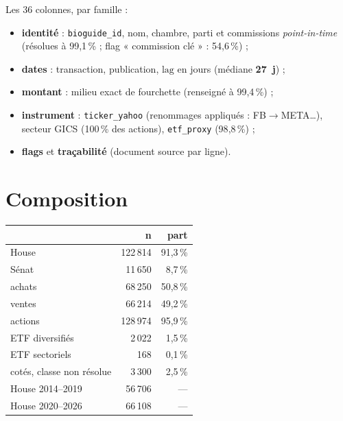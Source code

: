 \documentclass[10pt,a4paper,twocolumn]{article}
\newcommand{\code}[1]{\texttt{\small #1}}
\begin{document}
Les 36 colonnes, par famille :
\begin{itemize}
  \item \textbf{identité} : \code{bioguide\_id}, nom, chambre, parti et commissions
        \emph{point-in-time} (résolues à 99{,}1\,\% ; flag « commission clé » : 54{,}6\,\%) ;
  \item \textbf{dates} : transaction, publication, $\text{lag}$ en jours (médiane \textbf{27~j}) ;
  \item \textbf{montant} : milieu exact de fourchette (renseigné à 99{,}4\,\%) ;
  \item \textbf{instrument} : \code{ticker\_yahoo} (renommages appliqués : FB$\to$META\ldots),
        secteur GICS (100\,\% des actions), \code{etf\_proxy} (98{,}8\,\%) ;
  \item \textbf{flags} et \textbf{traçabilité} (document source par ligne).
\end{itemize}

\section{Composition}

\begin{center}
\begin{minipage}{\linewidth}\centering\small\setlength{\tabcolsep}{4pt}
\begin{tabular}{lrr}
\toprule
 & \textbf{n} & \textbf{part}\\
\midrule
House                  & 122\,814 & 91{,}3\,\%\\
Sénat                  & 11\,650  & 8{,}7\,\%\\
achats                 & 68\,250  & 50{,}8\,\%\\
ventes                 & 66\,214  & 49{,}2\,\%\\
actions                & 128\,974 & 95{,}9\,\%\\
ETF diversifiés        & 2\,022   & 1{,}5\,\%\\
ETF sectoriels         & 168      & 0{,}1\,\%\\
cotés, classe non résolue & 3\,300 & 2{,}5\,\%\\
House 2014--2019       & 56\,706  & ---\\
House 2020--2026       & 66\,108  & ---\\
\bottomrule
\end{tabular}
\end{minipage}
\end{center}
\end{document}
